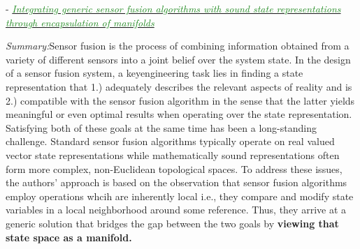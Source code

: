 \documentclass[]{article}
\newcommand{\paperentry}[4]{
            \hangindent=1cm
            \textcolor{red}{\cite{#1}} - \href{run:../References/#3}{\textcolor{ForestGreen}{\textit{#2}}}
            
            \noindent            
            \begin{minipage}[t]{0.1\linewidth}\hfill\end{minipage}
            \begin{minipage}[t]{0.8\linewidth}\textcolor{NavyBlue}{{\textit{Summary:}}}#4\end{minipage}
            \vspace{.25cm}
          }
\begin{document}
		\paperentry{Hertzberg2013SensorFusionStateRepManifolds}
		{Integrating generic sensor fusion algorithms with sound state representations through encapsulation of manifolds}
		{Manifold_Representation_Learning/Alignment/Hertzberg2013SensorFusionStateRepManifolds.pdf}
		{Sensor fusion is the process of combining information obtained from a variety of different sensors into a joint belief over the system state.  In the design of a sensor fusion system, a keyengineering task lies in finding a state representation that 1.) adequately describes the relevant aspects of reality and is 2.) compatible with the sensor fusion algorithm in the sense that the latter yields meaningful or even optimal results when operating over the state representation.\\
		Satisfying both of these goals at the same time has been a long-standing challenge.  Standard sensor fusion algorithms typically operate on real valued vector state representations while mathematically sound representations often form more complex, non-Euclidean topological spaces.  To address these issues, the authors' approach is based on the observation that sensor fusion algorithms employ operations whcih are inherently local i.e., they compare and modify state variables in a local neighborhood around some reference.  Thus, they arrive at a  generic solution that bridges the gap between the two goals by \textbf{viewing that state space as a manifold.}}
		
\end{document}
